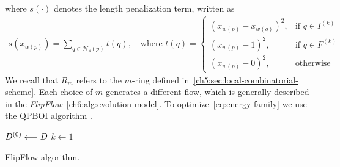 where $s(\cdot)$ denotes the length penalization term, written as
\begin{align}
  s(x_{w(p)})=\sum_{q \in \mathcal{N}_4(p)}{ t(q) }, \quad \text{where } t(q) = \left\{\begin{array}{ll}
  (x_{w(p)}-x_{w(q)})^2, & \text{if } q \in I^{(k)}\\
  (x_{w(p)}-1)^2, & \text{if } q \in F^{(k)}\\
  (x_{w(p)}-0)^2, & \text{otherwise }
  \end{array}\right.
  \label{eq:length-penalization}
\end{align}
%
%
We recall that $R_m$ refers to the $m$-ring defined in~\cref{ch5:sec:local-combinatorial-scheme}. Each choice of $m$ generates a different flow, which is generally described in the \emph{FlipFlow}~\cref{ch6:alg:evolution-model}. To optimize~\cref{eq:energy-family} we use the QPBOI algorithm \cite{rother07qpbo}.


\begin{algorithm}
 
 \BlankLine
 $D^{(0)} \longleftarrow D$\;
 $k \longleftarrow 1$\;
 \caption{FlipFlow algorithm.}
 \label{ch6:alg:evolution-model}  
\end{algorithm}

